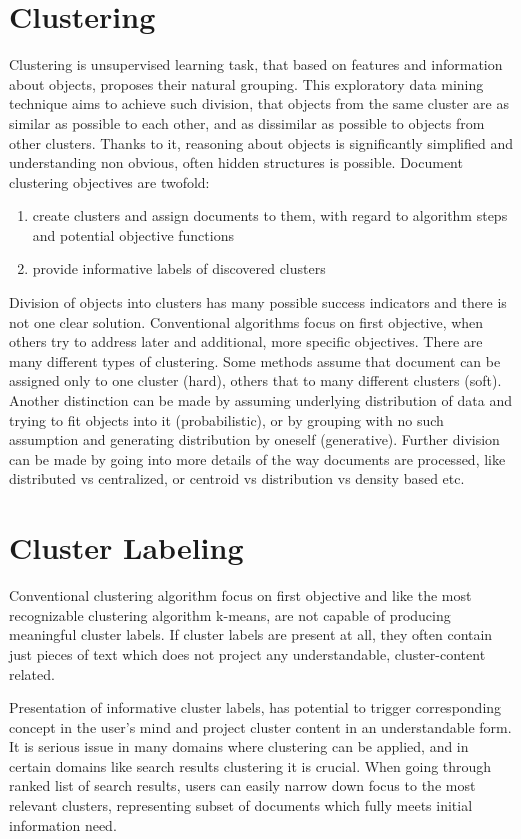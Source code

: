 \documentclass[a4paper, 12pt, oneside]{Thesis} %
\begin{document}
\section{Clustering} Clustering is unsupervised learning task, that based on features and information about objects, proposes their natural grouping. This exploratory data mining technique aims to achieve such division, that objects from the same cluster are as similar as possible to each other, and as dissimilar as possible to objects from other clusters. Thanks to it, reasoning about objects is significantly simplified and understanding non obvious, often hidden structures is possible. Document clustering objectives are twofold:
\begin{enumerate}
\item create clusters and assign documents to them, with regard to algorithm steps and potential objective functions
\item provide informative labels of discovered clusters
\end{enumerate}

Division of objects into clusters has many possible success indicators and there is not one clear solution. Conventional algorithms focus on first objective, when others try to address later and additional, more specific objectives. There are many different types of clustering. Some methods assume that document can be assigned only to one cluster (hard), others that to many different clusters (soft). Another distinction can be made by assuming underlying distribution of data and trying to fit objects into it (probabilistic), or by grouping with no such assumption and generating distribution by oneself (generative). Further division can be made by going into more details of the way documents are processed, like distributed vs centralized, or centroid vs distribution vs density based etc.

\section{Cluster Labeling} Conventional clustering algorithm focus on first objective and like the most recognizable clustering algorithm k-means, are not capable of producing meaningful cluster labels. If cluster labels are present at all, they often contain just pieces of text which does not project any understandable, cluster-content related. 

Presentation of informative cluster labels, has potential to trigger corresponding concept in the user’s mind and project cluster content in an understandable form. It is serious issue in many domains where clustering can be applied, and in certain domains like search results clustering it is crucial. When going through ranked list of search results, users can easily narrow down focus to the most relevant clusters, representing subset of documents which fully meets initial information need.
\end{document}

